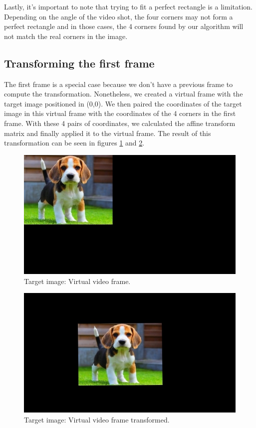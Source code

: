 \documentclass[]{IEEEtran}
\begin{document}
Lastly, it's important to note that trying to fit a perfect rectangle is a limitation. Depending on the angle of the video shot, the four corners may not form a perfect rectangle and in those cases, the 4 corners found by our algorithm will not match the real corners in the image.

\subsection{Transforming the first frame}
The first frame is a special case because we don't have a previous frame to compute the transformation. Nonetheless, we created a virtual frame with the target image positioned in (0,0). We then paired the coordinates of the target image in this virtual frame with the coordinates of the 4 corners in the first frame. With these 4 pairs of coordinates, we calculated the affine transform matrix and finally applied it to the virtual frame. The result of this transformation can be seen in figures \ref{fig:target1} and \ref{fig:target2}.

\begin{figure}[h]
  \includegraphics[width=\linewidth]{./figures/augmentation/target1.jpg}
  \caption{Target image: Virtual video frame.}
  \label{fig:target1}
\end{figure}

\begin{figure}[h]
  \includegraphics[width=\linewidth]{./figures/augmentation/target2.jpg}
  \caption{Target image: Virtual video frame transformed.}
  \label{fig:target2}
\end{figure}
\end{document}
